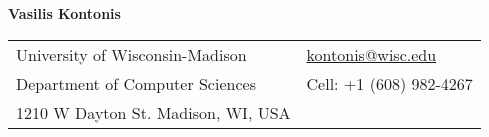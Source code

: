 \documentclass[letterpaper,11pt,oneside]{article}
\begin{document}

\noindent  \LARGE{\textbf{Vasilis Kontonis}}  \\
\vspace{-2ex}
\normalsize


\begin{center}
\begin{tabular}{l l}
 University of Wisconsin-Madison & \hspace{1in} \href{mailto:kontonis@wisc.edu}{kontonis@wisc.edu} \\
 Department of Computer Sciences & \hspace{1in}  Cell: +1 (608) 982-4267\\
 1210 W Dayton St. Madison, WI, USA & \hspace{1in} \\
\end{tabular}
\end{center}

\vspace{1em}

\end{document}
